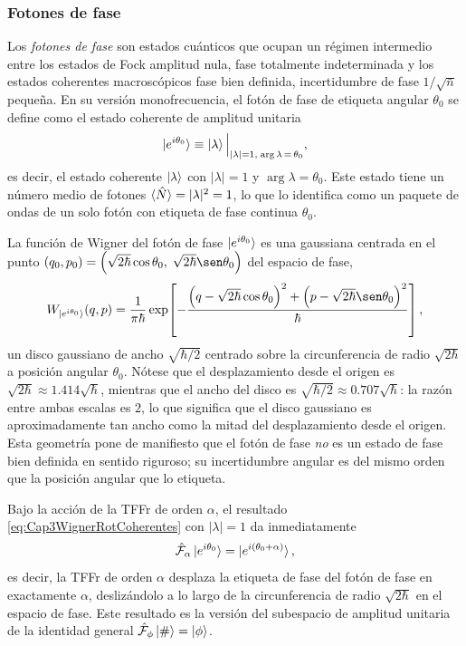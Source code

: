             \subsubsection{Fotones de fase}

                Los \textit{fotones de fase} son estados cuánticos que ocupan un régimen intermedio entre los estados de Fock amplitud nula, fase totalmente indeterminada y los estados coherentes macroscópicos fase bien definida, incertidumbre de fase $1/\sqrt{\bar{n}}$ pequeña. En su versión monofrecuencia, el fotón de fase de etiqueta angular $\theta_0$ se define como el estado coherente de amplitud unitaria
                \begin{equation}\label{eq:Cap3FotonDeFase}
                    \ket{e^{i\theta_0}} \equiv \ket{\lambda}\Big|_{|\lambda|=1,\;\arg\lambda\,=\,\theta_0},
                \end{equation}
                es decir, el estado coherente $\ket{\lambda}$ con $|\lambda| = 1$ y $\arg\lambda = \theta_0$. Este estado tiene un número medio de fotones $\braket{\hat{N}} = |\lambda|^2 = 1$, lo que lo identifica como un paquete de ondas de un solo fotón con etiqueta de fase continua $\theta_0$.

                La función de Wigner del fotón de fase $\ket{e^{i\theta_0}}$ es una gaussiana centrada en el punto $(q_0, p_0) = \left(\sqrt{2\hbar}\cos\theta_0,\;\sqrt{2\hbar}\sen\theta_0\right)$ del espacio de fase,
                \begin{equation}\label{eq:Cap3WignerFotonFase}
                    W_{\ket{e^{i\theta_0}}}(q,p) = \frac{1}{\pi\hbar}\exp\!\left[-\frac{\left(q-\sqrt{2\hbar}\cos\theta_0\right)^2+\left(p-\sqrt{2\hbar}\sen\theta_0\right)^2}{\hbar}\right],
                \end{equation}
                un disco gaussiano de ancho $\sqrt{\hbar/2}$ centrado sobre la circunferencia de radio $\sqrt{2\hbar}$ a posición angular $\theta_0$. Nótese que el desplazamiento desde el origen es $\sqrt{2\hbar}\approx 1.414\sqrt{\hbar}$, mientras que el ancho del disco es $\sqrt{\hbar/2}\approx 0.707\sqrt{\hbar}$: la razón entre ambas escalas es $2$, lo que significa que el disco gaussiano es aproximadamente tan ancho como la mitad del desplazamiento desde el origen. Esta geometría pone de manifiesto que el fotón de fase \textit{no} es un estado de fase bien definida en sentido riguroso; su incertidumbre angular es del mismo orden que la posición angular que lo etiqueta.

                Bajo la acción de la TFFr de orden $\alpha$, el resultado \ref{eq:Cap3WignerRotCoherentes} con $|\lambda|=1$ da inmediatamente
                \begin{equation}\label{eq:Cap3FrFTFotonFase}
                    \hat{\mathcal{F}}_\alpha\ket{e^{i\theta_0}} = \ket{e^{i(\theta_0+\alpha)}},
                \end{equation}
                es decir, la TFFr de orden $\alpha$ desplaza la etiqueta de fase del fotón de fase en exactamente $\alpha$, deslizándolo a lo largo de la circunferencia de radio $\sqrt{2\hbar}$ en el espacio de fase. Este resultado es la versión del subespacio de amplitud unitaria de la identidad general $\hat{\mathcal{F}}_\phi\ket{\#} = \ket{\phi}$.

